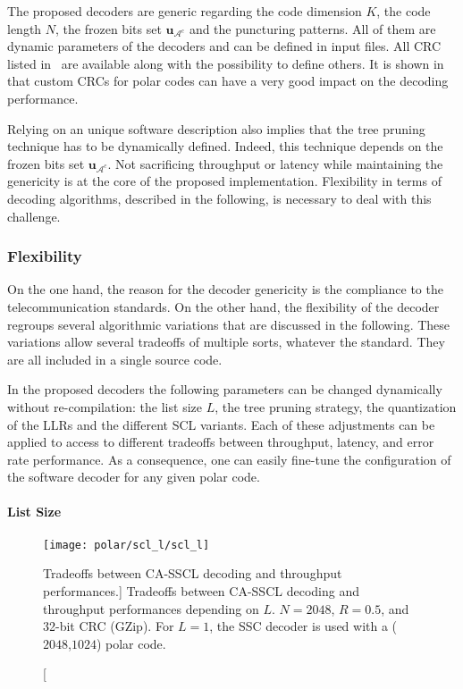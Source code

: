 The proposed decoders are generic regarding the code dimension $K$, the code
length $N$, the frozen bits set $\bm{u}_{\mathcal{A}^c}$ and the puncturing
patterns. All of them are dynamic parameters of the decoders and can be defined
in input files. All CRC listed in~\cite{CRCWiki2017} are available along with
the possibility to define others. It is shown in~\cite{Zhang2017} that custom
CRCs for polar codes can have a very good impact on the decoding performance.

Relying on an unique software description also implies that the tree pruning
technique has to be dynamically defined. Indeed, this technique depends on the
frozen bits set $\bm{u}_{\mathcal{A}^c}$. Not sacrificing throughput or latency
while maintaining the genericity is at the core of the proposed implementation.
Flexibility in terms of decoding algorithms, described in the following, is
necessary to deal with this challenge.

\subsubsection{Flexibility}

On the one hand, the reason for the decoder genericity is the compliance to the
telecommunication standards. On the other hand, the flexibility of the decoder
regroups several algorithmic variations that are discussed in the following.
These variations allow several tradeoffs of multiple sorts, whatever the
standard. They are all included in a single source code.

In the proposed decoders the following parameters can be changed dynamically
without re-compilation: the list size $L$, the tree pruning strategy, the
quantization of the LLRs and the different SCL variants. Each of these
adjustments can be applied to access to different tradeoffs between throughput,
latency, and error rate performance. As a consequence, one can easily fine-tune
the configuration of the software decoder for any given polar code.

\paragraph{List Size}

\begin{figure}[htp]
  \centering
  \texttt{[image: polar/scl\_l/scl\_l]}
  \caption
    [Tradeoffs between CA-SSCL decoding and throughput performances.]
    {Tradeoffs between CA-SSCL decoding and throughput performances depending on
    $L$. $N=2048$, $R=0.5$, and 32-bit CRC (GZip). For $L=1$, the SSC decoder is
    used with a ($2048$,$1024$) polar code.}
  \label{plot:alg_polar_scl_l}
\end{figure}

